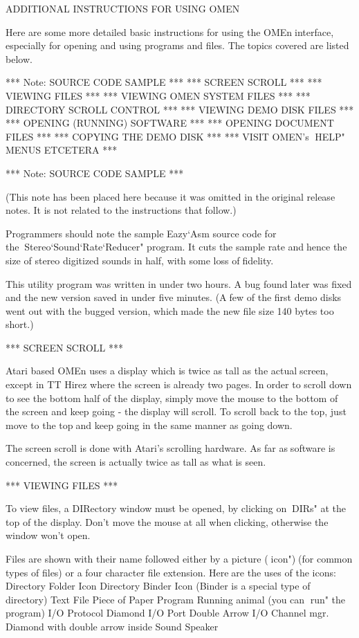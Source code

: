                ADDITIONAL INSTRUCTIONS FOR USING OMEN

Here are some more detailed basic instructions for using the OMEninterface, especially for opening and using programs and files. Thetopics covered are listed below.

*** Note: SOURCE CODE SAMPLE ***
*** SCREEN SCROLL ***
*** VIEWING FILES ***
*** VIEWING OMEN SYSTEM FILES ***
*** DIRECTORY SCROLL CONTROL ***
*** VIEWING DEMO DISK FILES ***
*** OPENING (RUNNING) SOFTWARE ***
*** OPENING DOCUMENT FILES ***
*** COPYING THE DEMO DISK ***
*** VISIT OMEN's HELP" MENUS ETCETERA ***


*** Note: SOURCE CODE SAMPLE ***

(This note has been placed here because it was omitted in theoriginal release notes. It is not related to the instructions thatfollow.)

Programmers should note the sample Eazy`Asm source code for theStereo`Sound`Rate`Reducer" program. It cuts the sample rate andhence the size of stereo digitized sounds in half, with some loss offidelity.

This utility program was written in under two hours. A bug foundlater was fixed and the new version saved in under five minutes. (Afew of the first demo disks went out with the bugged version, whichmade the new file size 140 bytes too short.)


*** SCREEN SCROLL ***

Atari based OMEn uses a display which is twice as tall as the actualscreen, except in TT Hirez where the screen is already two pages. Inorder to scroll down to see the bottom half of the display, simplymove the mouse to the bottom of the screen and keep going - thedisplay will scroll. To scroll back to the top, just move to the topand keep going in the same manner as going down.

The screen scroll is done with Atari's scrolling hardware. As far assoftware is concerned, the screen is actually twice as tall as whatis seen.


*** VIEWING FILES ***

To view files, a DIRectory window must be opened, by clicking onDIRs" at the top of the display. Don't move the mouse at all whenclicking, otherwise the window won't open.

Files are shown with their name followed either by a picture (icon")(for common types of files) or a four character file extension. Hereare the uses of the icons:
   Directory     Folder Icon
   Directory     Binder Icon (Binder is a special type of directory)
   Text File     Piece of Paper
   Program       Running animal (you can run" the program)
   I/O Protocol  Diamond
   I/O Port      Double Arrow
   I/O Channel mgr.  Diamond with double arrow inside
   Sound         Speaker

